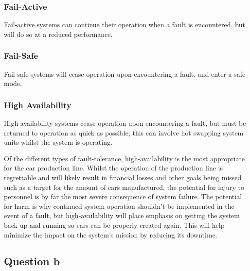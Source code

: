 \documentclass[]{report}
\begin{document}
				\subsubsection{Fail-Active}
				Fail-active systems can continue their operation when a fault is encountered, but will do so at a reduced performance.
				
				\subsubsection{Fail-Safe}
				Fail-safe systems will cease operation upon encountering a fault, and enter a safe mode.
				
				\subsubsection{High Availability}
				High availability systems cease operation upon encountering a fault, but must be returned to operation as quick as possible, this can involve hot swapping system units whilst the system is operating.
				
				Of the different types of fault-tolerance, high-availability is the most appropriate for the car production line. Whilst the operation of the production line is regrettable and will likely result in financial losses and other goals being missed such as a target for the amount of cars manufactured, the potential for injury to personnel is by far the most severe consequence of system failure. The potential for harm is why continued system operation shouldn't be implemented in the event of a fault, but high-availability will place emphasis on getting the system back up and running so cars can be properly created again. This will help minimize the impact on the system's mission by reducing its downtime.
				
				
				
			
			\subsection{Question b}
\end{document}
